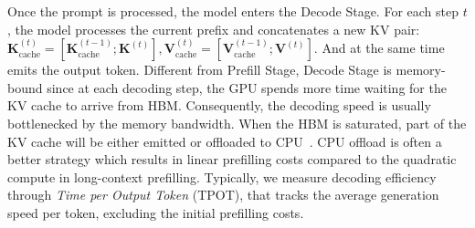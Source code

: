 Once the prompt is processed, the model enters the Decode Stage. For each step $t$, the model processes the current prefix and concatenates a new KV pair: $\textbf{K}_{\text{cache}}^{(t)}=[\textbf{K}_{\text{cache}}^{(t-1)};\textbf{K}^{(t)}],\textbf{V}_{\text{cache}}^{(t)}=[\textbf{V}_{\text{cache}}^{(t-1)};\textbf{V}^{(t)}]$. 
And at the same time emits the output token. Different from Prefill Stage, Decode Stage is memory-bound since at each decoding step, the GPU spends more time waiting for the KV cache to arrive from HBM. Consequently, the decoding speed is usually bottlenecked by the memory bandwidth.
When the HBM is saturated, part of the KV cache will be either emitted or offloaded to CPU~\cite{jin2024compute}.
CPU offload is often a better strategy which results in linear prefilling costs compared to the quadratic compute in long-context prefilling.
Typically, we measure decoding efficiency through \emph{Time per Output Token} (TPOT), that tracks the average generation speed per token, excluding the initial prefilling costs.